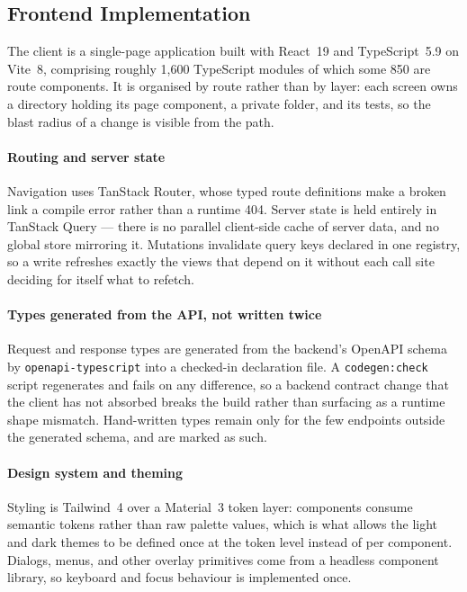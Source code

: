 \subsection{Frontend Implementation}
\label{sec:impl_frontend}

The client is a single-page application built with React~19 and TypeScript~5.9 on Vite~8, comprising roughly 1{,}600 TypeScript modules of which some 850 are route components. It is organised by route rather than by layer: each screen owns a directory holding its page component, a private  folder, and its tests, so the blast radius of a change is visible from the path.

\paragraph{Routing and server state}
Navigation uses TanStack Router, whose typed route definitions make a broken link a compile error rather than a runtime 404. Server state is held entirely in TanStack Query --- there is no parallel client-side cache of server data, and no global store mirroring it. Mutations invalidate query keys declared in one registry, so a write refreshes exactly the views that depend on it without each call site deciding for itself what to refetch.

\paragraph{Types generated from the API, not written twice}
Request and response types are generated from the backend's OpenAPI schema by \texttt{openapi-typescript} into a checked-in declaration file. A \texttt{codegen:check} script regenerates and fails on any difference, so a backend contract change that the client has not absorbed breaks the build rather than surfacing as a runtime shape mismatch. Hand-written types remain only for the few endpoints outside the generated schema, and are marked as such.

\paragraph{Design system and theming}
Styling is Tailwind~4 over a Material~3 token layer: components consume semantic tokens rather than raw palette values, which is what allows the light and dark themes to be defined once at the token level instead of per component. Dialogs, menus, and other overlay primitives come from a headless component library, so keyboard and focus behaviour is implemented once.


